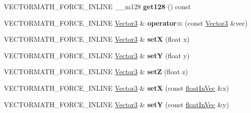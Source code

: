 \begin{DoxyCompactItemize}
\item 
\mbox{\label{classVectormath_1_1Aos_1_1Vector3_a29b89eaceee70af54de157f76b104891}} 
V\+E\+C\+T\+O\+R\+M\+A\+T\+H\+\_\+\+F\+O\+R\+C\+E\+\_\+\+I\+N\+L\+I\+NE \+\_\+\+\_\+m128 {\bfseries get128} () const
\item 
\mbox{\label{classVectormath_1_1Aos_1_1Vector3_adeff486f351f2d8b5df32418700d7889}} 
V\+E\+C\+T\+O\+R\+M\+A\+T\+H\+\_\+\+F\+O\+R\+C\+E\+\_\+\+I\+N\+L\+I\+NE \hyperlink{classVectormath_1_1Aos_1_1Vector3}{Vector3} \& {\bfseries operator=} (const \hyperlink{classVectormath_1_1Aos_1_1Vector3}{Vector3} \&vec)
\item 
\mbox{\label{classVectormath_1_1Aos_1_1Vector3_ae4d2df8936f102299b5973bfca738455}} 
V\+E\+C\+T\+O\+R\+M\+A\+T\+H\+\_\+\+F\+O\+R\+C\+E\+\_\+\+I\+N\+L\+I\+NE \hyperlink{classVectormath_1_1Aos_1_1Vector3}{Vector3} \& {\bfseries setX} (float x)
\item 
\mbox{\label{classVectormath_1_1Aos_1_1Vector3_a4fb08b20326003f01cbe1a30035ee2eb}} 
V\+E\+C\+T\+O\+R\+M\+A\+T\+H\+\_\+\+F\+O\+R\+C\+E\+\_\+\+I\+N\+L\+I\+NE \hyperlink{classVectormath_1_1Aos_1_1Vector3}{Vector3} \& {\bfseries setY} (float y)
\item 
\mbox{\label{classVectormath_1_1Aos_1_1Vector3_a33e706c6d8715937610ec00d3efc4f80}} 
V\+E\+C\+T\+O\+R\+M\+A\+T\+H\+\_\+\+F\+O\+R\+C\+E\+\_\+\+I\+N\+L\+I\+NE \hyperlink{classVectormath_1_1Aos_1_1Vector3}{Vector3} \& {\bfseries setZ} (float z)
\item 
\mbox{\label{classVectormath_1_1Aos_1_1Vector3_a69ef4875067ba3bcbd5f114bda6e3c43}} 
V\+E\+C\+T\+O\+R\+M\+A\+T\+H\+\_\+\+F\+O\+R\+C\+E\+\_\+\+I\+N\+L\+I\+NE \hyperlink{classVectormath_1_1Aos_1_1Vector3}{Vector3} \& {\bfseries setX} (const \hyperlink{classVectormath_1_1floatInVec}{float\+In\+Vec} \&x)
\item 
\mbox{\label{classVectormath_1_1Aos_1_1Vector3_aa4b8ca96765e9252105b1cca92545043}} 
V\+E\+C\+T\+O\+R\+M\+A\+T\+H\+\_\+\+F\+O\+R\+C\+E\+\_\+\+I\+N\+L\+I\+NE \hyperlink{classVectormath_1_1Aos_1_1Vector3}{Vector3} \& {\bfseries setY} (const \hyperlink{classVectormath_1_1floatInVec}{float\+In\+Vec} \&y)

\end{DoxyCompactItemize}
